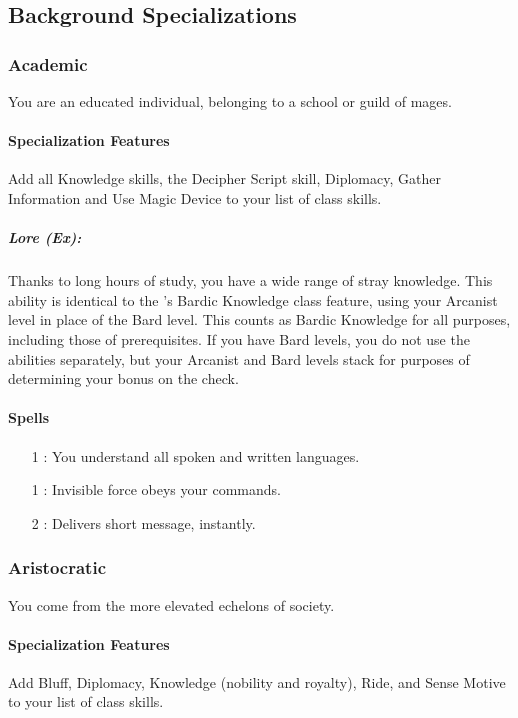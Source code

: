 \subsection{Background Specializations}

\subsubsection{Academic}
You are an educated individual, belonging to a school or guild of mages.
\paragraph{Specialization Features}
Add all Knowledge skills, the Decipher Script skill, Diplomacy, Gather Information and Use Magic Device to your list of class skills.
\subparagraph{Lore (Ex):}
Thanks to long hours of study, you have a wide range of stray knowledge. This ability is identical to the 's Bardic Knowledge class feature, using your Arcanist level in place of the Bard level. This counts as Bardic Knowledge for all purposes, including those of prerequisites. If you have Bard levels, you do not use the abilities separately, but your Arcanist and Bard levels stack for purposes of determining your bonus on the check.
\paragraph{Spells}
\begin{itemize}
 \item[1] : You understand all spoken and written languages.
 \item[1] : Invisible force obeys your commands.
 \item[2] : Delivers short message, instantly.
\end{itemize}

\subsubsection{Aristocratic}
You come from the more elevated echelons of society.
\paragraph{Specialization Features}
Add Bluff, Diplomacy, Knowledge (nobility and royalty), Ride, and Sense Motive to your list of class skills.
